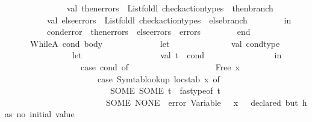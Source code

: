 \begin{isabellebody}
\ \ \ \ \isanewline
\ \ \ \ \ \ \ \ \ \ val\ then{\isacharunderscore}{\kern0pt}errors\ {\isacharequal}{\kern0pt}\ List{\isachardot}{\kern0pt}foldl\ check{\isacharunderscore}{\kern0pt}action{\isacharunderscore}{\kern0pt}types\ {\isacharbrackleft}{\kern0pt}{\isacharbrackright}{\kern0pt}\ then{\isacharunderscore}{\kern0pt}branch\isanewline
\ \ \ \ \ \ \ \ \ \ val\ else{\isacharunderscore}{\kern0pt}errors\ {\isacharequal}{\kern0pt}\ List{\isachardot}{\kern0pt}foldl\ check{\isacharunderscore}{\kern0pt}action{\isacharunderscore}{\kern0pt}types\ {\isacharbrackleft}{\kern0pt}{\isacharbrackright}{\kern0pt}\ else{\isacharunderscore}{\kern0pt}branch\isanewline
\ \ \ \ \ \ \ \ in\isanewline
\ \ \ \ \ \ \ \ \ \ cond{\isacharunderscore}{\kern0pt}error\ {\isacharat}{\kern0pt}\ then{\isacharunderscore}{\kern0pt}errors\ {\isacharat}{\kern0pt}\ else{\isacharunderscore}{\kern0pt}errors\ {\isacharat}{\kern0pt}\ errors\isanewline
\ \ \ \ \ \ \ \ end\isanewline
\isanewline
\ \ \ \ \ {\isacharbar}{\kern0pt}\ WhileA\ {\isacharparenleft}{\kern0pt}cond{\isacharcomma}{\kern0pt}\ body{\isacharparenright}{\kern0pt}\ {\isacharequal}{\kern0pt}{\isachargreater}{\kern0pt}\isanewline
\ \ \ \ \ \ \ \ \ \ \ \ let\isanewline
\ \ \ \ \ \ \ \ \ \ \ \ \ \ val\ cond{\isacharunderscore}{\kern0pt}type\ {\isacharequal}{\kern0pt}\isanewline
\ \ \ \ \ \ \ \ \ \ \ \ \ \ \ \ let\isanewline
\ \ \ \ \ \ \ \ \ \ \ \ \ \ \ \ \ \ val\ t\ {\isacharequal}{\kern0pt}\ cond\isanewline
\ \ \ \ \ \ \ \ \ \ \ \ \ \ \ \ in\isanewline
\ \ \ \ \ \ \ \ \ \ \ \ \ \ \ \ \ \ case\ cond\ of\isanewline
\ \ \ \ \ \ \ \ \ \ \ \ \ \ \ \ \ \ \ \ Free\ {\isacharparenleft}{\kern0pt}x{\isacharcomma}{\kern0pt}\ {\isacharunderscore}{\kern0pt}{\isacharparenright}{\kern0pt}\ {\isacharequal}{\kern0pt}{\isachargreater}{\kern0pt}\isanewline
\ \ \ \ \ \ \ \ \ \ \ \ \ \ \ \ \ \ \ \ \ \ {\isacharparenleft}{\kern0pt}case\ Symtab{\isachardot}{\kern0pt}lookup\ locstab\ x\ of\isanewline
\ \ \ \ \ \ \ \ \ \ \ \ \ \ \ \ \ \ \ \ \ \ \ \ \ SOME\ {\isacharparenleft}{\kern0pt}SOME\ t{\isacharprime}{\kern0pt}{\isacharparenright}{\kern0pt}\ {\isacharequal}{\kern0pt}{\isachargreater}{\kern0pt}\ fastype{\isacharunderscore}{\kern0pt}of\ t{\isacharprime}{\kern0pt}\isanewline
\ \ \ \ \ \ \ \ \ \ \ \ \ \ \ \ \ \ \ \ \ \ \ {\isacharbar}{\kern0pt}\ SOME\ NONE\ {\isacharequal}{\kern0pt}{\isachargreater}{\kern0pt}\ error\ {\isacharparenleft}{\kern0pt}{\isachardoublequote}{\kern0pt}Variable\ {\isachardoublequote}{\kern0pt}\ {\isacharcircum}{\kern0pt}\ x\ {\isacharcircum}{\kern0pt}\ {\isachardoublequote}{\kern0pt}\ declared\ but\ has\ no\ initial\ value{\isachardoublequote}{\kern0pt}{\isacharparenright}{\kern0pt}\isanewline

\end{isabellebody}
